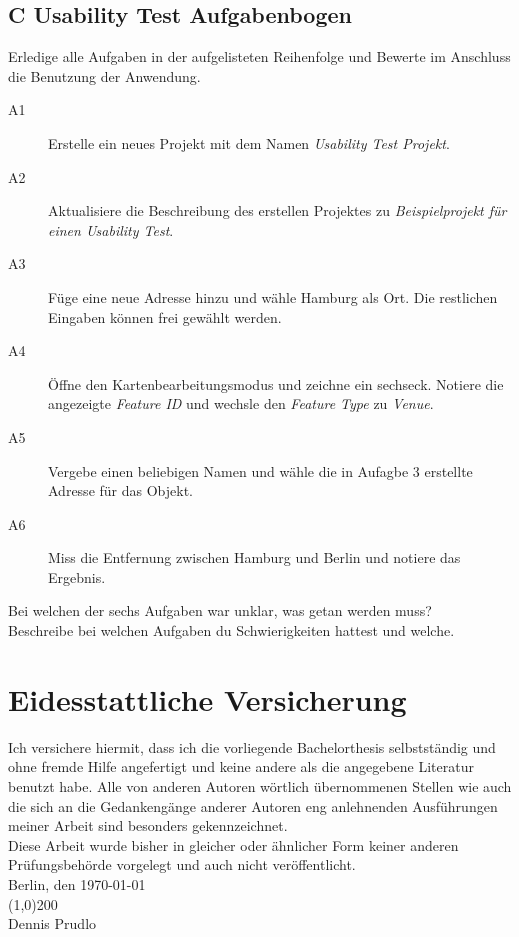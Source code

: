 \section*{C Usability Test Aufgabenbogen}
\label{sec:appendixc}
Erledige alle Aufgaben in der aufgelisteten Reihenfolge und Bewerte im Anschluss die Benutzung der Anwendung.
\begin{description}
	\item[A1] Erstelle ein neues Projekt mit dem Namen \emph{Usability Test Projekt}.
	\item[A2] Aktualisiere die Beschreibung des erstellen Projektes zu \emph{Beispielprojekt für einen Usability Test}.
	\item[A3] Füge eine neue Adresse hinzu und wähle Hamburg als Ort. Die restlichen Eingaben können frei gewählt werden.
	\item[A4] Öffne den Kartenbearbeitungsmodus und zeichne ein sechseck. Notiere die angezeigte \emph{Feature ID} und wechsle den \emph{Feature Type} zu \emph{Venue}.
	\item[A5] Vergebe einen beliebigen Namen und wähle die in Aufagbe 3 erstellte Adresse für das Objekt.
	\item[A6] Miss die Entfernung zwischen Hamburg und Berlin und notiere das Ergebnis.
\end{description}
\begin{description}
	\item[Bei welchen der sechs Aufgaben war unklar, was getan werden muss?]
	\item[Beschreibe bei welchen Aufgaben du Schwierigkeiten hattest und welche.]
\end{description}

%
\chapter*{Eidesstattliche Versicherung}
Ich versichere hiermit, dass ich die vorliegende Bachelorthesis selbstständig und ohne fremde Hilfe
angefertigt und keine andere als die angegebene Literatur benutzt habe. Alle von anderen Autoren
wörtlich übernommenen Stellen wie auch die sich an die Gedankengänge anderer Autoren eng anlehnenden
Ausführungen meiner Arbeit sind besonders gekennzeichnet.\\[1ex]
Diese Arbeit wurde bisher in gleicher oder ähnlicher Form keiner anderen Prüfungsbehörde vorgelegt
und auch nicht veröffentlicht.\\[3ex]
Berlin, den \today\\[20ex]
\line(1,0){200}\\
Dennis Prudlo
\clearpage
